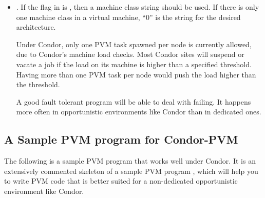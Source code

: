 \begin{itemize}
\item {}.  If  the flag in  is 
  , then a machine class string 
  should be used.  If there is only one machine class
  in a virtual machine, ``0'' is the string for the desired architecture.

  Under Condor, only one
  PVM task spawned per node is currently allowed,
  due to Condor's machine load checks.
  Most Condor 
  sites will suspend or vacate
  a job if the load on its machine is higher than a specified
  threshold.
  Having more than one PVM task per node would push the load
  higher than the threshold.

  A good fault tolerant program will be able to deal with
   failing.  It happens more often in opportunistic 
  environments like Condor than in dedicated ones.

\end{itemize}

\subsection{A Sample PVM program for Condor-PVM}

The following is a sample PVM program that works well under Condor.
It is an extensively commented skeleton of a sample PVM
program , which will help you to
write PVM code that is better suited for a non-dedicated opportunistic
environment like Condor.

